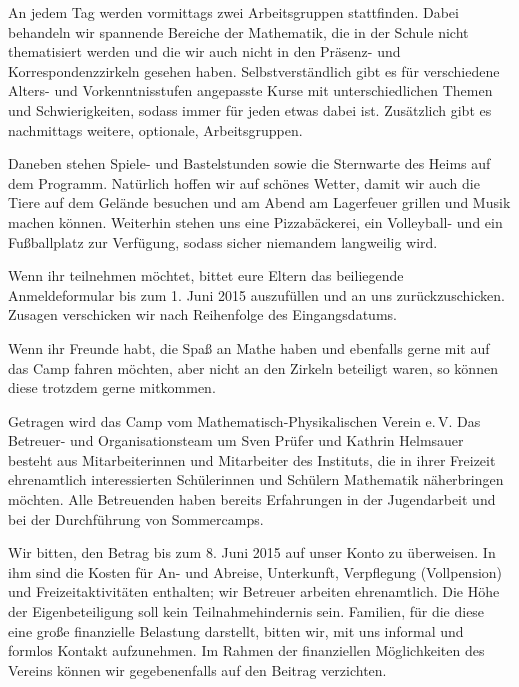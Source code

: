 \documentclass[12pt]{zettel}
\begin{document}
An jedem Tag werden vormittags zwei Arbeitsgruppen stattfinden. Dabei behandeln wir spannende
Bereiche der Mathematik, die in der Schule nicht thematisiert werden und die
wir auch nicht in den Präsenz- und Korrespondenzzirkeln gesehen haben.
Selbstverständlich gibt es für verschiedene Alters- und Vorkenntnisstufen angepasste Kurse
mit unterschiedlichen Themen und Schwierigkeiten, sodass immer für jeden
etwas dabei ist. Zusätzlich gibt es nachmittags weitere, optionale,
Arbeitsgruppen.

Daneben stehen Spiele- und Bastelstunden sowie die
Sternwarte des Heims auf dem Programm. Natürlich hoffen wir auf
schönes Wetter, damit wir auch die Tiere auf dem Gelände besuchen
und am Abend am Lagerfeuer grillen und Musik machen können.
Weiterhin stehen uns eine Pizzabäckerei, ein Volleyball- und ein
Fußballplatz zur Verfügung, sodass sicher niemandem langweilig
wird.

\vspace{\medskipamount}

\begin{minipage}{0.63\textwidth}
Wenn ihr teilnehmen möchtet, bittet eure Eltern das beiliegende Anmeldeformular
bis zum 1. Juni 2015 auszufüllen und an uns zurückzuschicken. Zusagen
verschicken wir nach Reihenfolge des Eingangsdatums.
\end{minipage}

\vspace{\medskipamount}

\begin{minipage}{0.42\textwidth}
Wenn ihr Freunde
habt, die Spaß an Mathe haben und ebenfalls gerne mit auf das
Camp fahren möchten, aber nicht an den Zirkeln beteiligt waren, so
können diese trotzdem gerne mitkommen.
\end{minipage}

\newpage

Getragen wird das Camp vom Mathematisch-Physikalischen Verein e.\,V. Das
Betreuer- und Organisationsteam um Sven Prüfer und Kathrin Helmsauer besteht
aus Mitarbeiterinnen und Mitarbeiter des Instituts, die in ihrer Freizeit
ehrenamtlich interessierten Schülerinnen und Schülern Mathematik näherbringen
möchten. Alle Betreuenden haben
bereits Erfahrungen in der Jugendarbeit und bei der Durch\-füh\-rung von
Sommercamps.

Wir bitten, den Betrag bis zum 8. Juni 2015 auf unser Konto zu überweisen.
In ihm sind die Kosten für An- und Abreise, Unterkunft, Verpflegung
(Vollpension) und Freizeitaktivitäten enthalten; wir Betreuer arbeiten
ehrenamtlich. Die Höhe der Eigenbeteiligung soll kein Teilnahmehindernis sein.
Familien, für die diese eine große finanzielle Belastung darstellt, bitten wir,
mit uns informal und formlos Kontakt aufzunehmen. Im Rahmen der finanziellen Möglichkeiten des
Vereins können wir gegebenenfalls auf den Beitrag verzichten.
\end{document}
